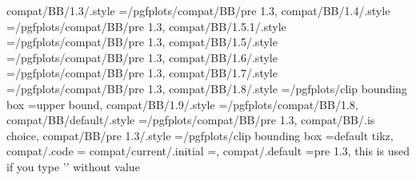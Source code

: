 {{{{{{{compat/BB/1.3/.style                                               ={/pgfplots/compat/BB/pre 1.3},                                                                                                     
compat/BB/1.4/.style                                               ={/pgfplots/compat/BB/pre 1.3},                                                                                                    
compat/BB/1.5.1/.style                                             ={/pgfplots/compat/BB/pre 1.3},                                                                                                    
compat/BB/1.5/.style                                               ={/pgfplots/compat/BB/pre 1.3},                                                                                                    
compat/BB/1.6/.style                                               ={/pgfplots/compat/BB/pre 1.3},                                                                                                    
compat/BB/1.7/.style                                               ={/pgfplots/compat/BB/pre 1.3},                                                                                                    
compat/BB/1.8/.style                                               ={/pgfplots/clip bounding box                                                                                                       =upper bound},                                            
compat/BB/1.9/.style                                               ={/pgfplots/compat/BB/1.8},                                                                                                        
compat/BB/default/.style                                           ={/pgfplots/compat/BB/pre 1.3},                                                                                                     
compat/BB/.is choice,
compat/BB/pre 1.3/.style                                           ={/pgfplots/clip bounding box                                                                                                       =default tikz},                                           
compat/.code                                                       ={                                                                                                                                 
compat/current/.initial                                            =,                                                                                                                                  
compat/.default                                                    =pre 1.3, this is used if you type '\pgfplotsset{compat}' without value                                                            
}}}}}}}}
